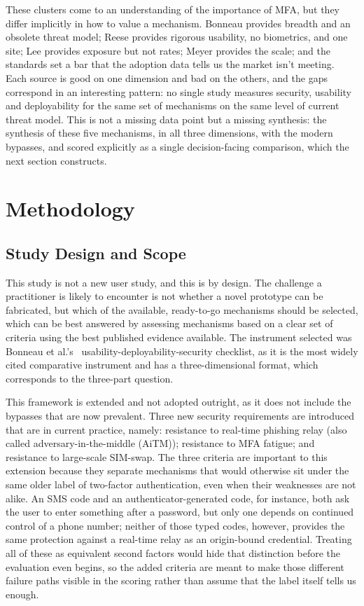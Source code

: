 \documentclass[sigconf]{acmart}
\begin{document}
These clusters come to an understanding of the importance of MFA, but they differ
implicitly in how to value a mechanism. Bonneau provides breadth and an obsolete threat model; Reese
provides rigorous usability, no biometrics, and one site; Lee provides exposure but not rates; Meyer provides the scale; and
the standards set a bar that the adoption data tells us the market isn't meeting. Each source is
good on one dimension and bad on the others, and the gaps correspond in an interesting pattern: no
single study measures security, usability and deployability for the same set of mechanisms on the
same level of current threat model. This is not a missing data point but a missing synthesis: the synthesis of these five mechanisms, in all three dimensions, with the modern bypasses, and scored
explicitly as a single decision-facing comparison, which the next section constructs.

\section{Methodology}

\subsection{Study Design and Scope}

This study is not a new user study, and this is by design. The challenge a practitioner is likely to
encounter is not whether a novel prototype can be fabricated, but which of the available,
ready-to-go mechanisms should be selected, which can be best answered by assessing mechanisms based
on a clear set of criteria using the best published evidence available. The instrument selected was
Bonneau et al.'s~\cite{bonneau:2012:quest} usability-deployability-security checklist, as it is the
most widely cited comparative instrument and has a three-dimensional format, which corresponds to
the three-part question.

This framework is extended and not adopted outright, as it does not include
the bypasses that are now prevalent. Three new security
requirements are introduced that are in current practice, namely: resistance to real-time phishing
relay (also called adversary-in-the-middle (AiTM)); resistance to MFA fatigue; and resistance to
large-scale SIM-swap. The three criteria are important to this extension because they separate mechanisms that would otherwise sit under the same older label of two-factor authentication, even when their weaknesses are not alike. An SMS code and an authenticator-generated code, for instance, both ask the user to enter something after a password, but only one depends on continued control of a phone number; neither of those typed codes, however, provides the same protection against a real-time relay as an origin-bound credential. Treating all of these as equivalent second factors would hide that distinction before the evaluation even begins, so the added criteria are meant to make those different failure paths visible in the scoring rather than assume that the label itself tells us enough.
\end{document}

